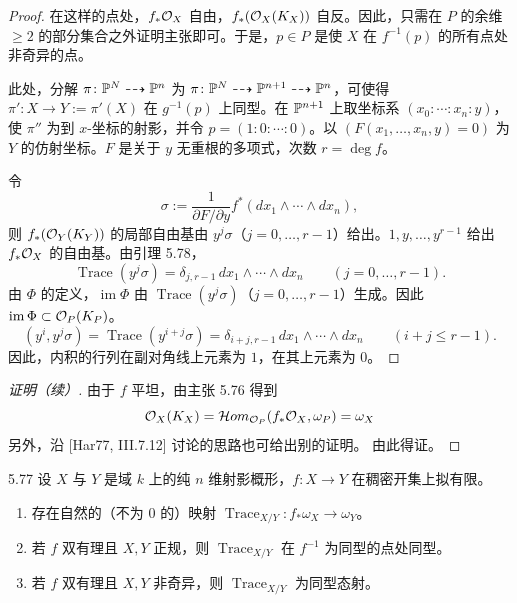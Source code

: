 \begin{proof}
在这样的点处，$f_*\mathcal{O}_X$ 自由，$f_*(\mathcal{O}_X(K_X))$ 自反。因此，只需在 $P$ 的余维 $\ge2$ 的部分集合之外证明主张即可。于是，$p\in P$ 是使 $X$ 在 $f^{-1}(p)$ 的所有点处非奇异的点。

此处，分解 $\pi\colon\mathbb{P}^N\dashrightarrow\mathbb{P}^n$ 为 $\pi\colon\mathbb{P}^N\dashrightarrow\mathbb{P}^{n+1}\dashrightarrow\mathbb{P}^n$，可使得 $\pi'\colon X\to Y:=\pi'(X)$ 在 $g^{-1}(p)$ 上同型。在 $\mathbb{P}^{n+1}$ 上取坐标系 $(x_0:\cdots:x_n:y)$，使 $\pi''$ 为到 $x$-坐标的射影，并令 $p=(1:0:\cdots:0)$。以 $(F(x_1,\dots,x_n,y)=0)$ 为 $Y$ 的仿射坐标。$F$ 是关于 $y$ 无重根的多项式，次数 $r=\deg f$。

令
\[
\sigma:=\frac{1}{\partial F/\partial y}f^*(dx_1\wedge\cdots\wedge dx_n),
\]
则 $f_*(\mathcal{O}_Y(K_Y))$ 的局部自由基由 $y^j\sigma$（$j=0,\dots,r-1$）给出。$1,y,\dots,y^{r-1}$ 给出 $f_*\mathcal{O}_X$ 的自由基。由引理 5.78，
\[
\operatorname{Trace}(y^j\sigma)=\delta_{j,r-1}\,dx_1\wedge\cdots\wedge dx_n\qquad(j=0,\dots,r-1).
\]
由 $\Phi$ 的定义，$\operatorname{im}\Phi$ 由 $\operatorname{Trace}(y^j\sigma)$（$j=0,\dots,r-1$）生成。因此 $\operatorname{im}\Phi\subset\mathcal{O}_P(K_P)$。
\[
(y^i,y^j\sigma)=\operatorname{Trace}(y^{i+j}\sigma)=\delta_{i+j,r-1}\,dx_1\wedge\cdots\wedge dx_n\qquad(i+j\le r-1).
\]
因此，内积的行列在副对角线上元素为 $1$，在其上元素为 $0$。
\end{proof}

\begin{proof}[证明（续）]
由于 $f$ 平坦，由主张 5.76 得到
\[
\mathcal{O}_X(K_X)=\mathcal{H}om_{\mathcal{O}_P}(f_*\mathcal{O}_X,\omega_P)=\omega_X
\]
另外，沿 [Har77, III.7.12] 讨论的思路也可给出别的证明。
由此得证。
\end{proof}

\begin{propositionp}{5.77}
设 $X$ 与 $Y$ 是域 $k$ 上的纯 $n$ 维射影概形，$f\colon X\to Y$ 在稠密开集上拟有限。
\begin{enumerate}[label=(\arabic*),leftmargin=*]
\item 存在自然的（不为 $0$ 的）映射 $\operatorname{Trace}_{X/Y}\colon f_*\omega_X\to\omega_Y$。
\item 若 $f$ 双有理且 $X,Y$ 正规，则 $\operatorname{Trace}_{X/Y}$ 在 $f^{-1}$ 为同型的点处同型。
\item 若 $f$ 双有理且 $X,Y$ 非奇异，则 $\operatorname{Trace}_{X/Y}$ 为同型态射。
\end{enumerate}
\end{propositionp}

